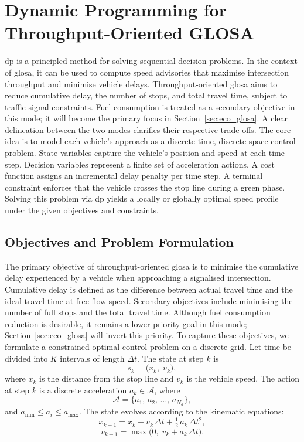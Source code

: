 \section{Dynamic Programming for Throughput-Oriented \ac{GLOSA}}
\label{sec:flow_glosa}

\ac{dp} is a principled method for solving sequential decision problems. In the context of \ac{glosa}, it can be used to compute speed advisories that maximise intersection throughput and minimise vehicle delays. Throughput-oriented \ac{glosa} aims to reduce cumulative delay, the number of stops, and total travel time, subject to traffic signal constraints. Fuel consumption is treated as a secondary objective in this mode; it will become the primary focus in Section~\ref{sec:eco_glosa}. A clear delineation between the two modes clarifies their respective trade-offs.
\mynewline
The core idea is to model each vehicle’s approach as a discrete-time, discrete-space control problem. State variables capture the vehicle’s position and speed at each time step. Decision variables represent a finite set of acceleration actions. A cost function assigns an incremental delay penalty per time step. A terminal constraint enforces that the vehicle crosses the stop line during a green phase. Solving this problem via \ac{dp} yields a locally or globally optimal speed profile under the given objectives and constraints.

\subsection{Objectives and Problem Formulation}
\label{subsec:flow_dp_formulation}

The primary objective of throughput-oriented \ac{glosa} is to minimise the cumulative delay experienced by a vehicle when approaching a signalised intersection. Cumulative delay is defined as the difference between actual travel time and the ideal travel time at free-flow speed. Secondary objectives include minimising the number of full stops and the total travel time. Although fuel consumption reduction is desirable, it remains a lower-priority goal in this mode; Section~\ref{sec:eco_glosa} will invert this priority.
\mynewline
To capture these objectives, we formulate a constrained optimal control problem on a discrete grid. Let time be divided into $K$ intervals of length $\Delta t$. The state at step $k$ is 
\[
s_k = \bigl(x_k,\;v_k\bigr),
\]
where $x_k$ is the distance from the stop line and $v_k$ is the vehicle speed. The action at step $k$ is a discrete acceleration $a_k\in\mathcal{A}$, where
\[
\mathcal{A}=\{a_1,\,a_2,\,\dots,\,a_{N_a}\},
\]
and $a_{\min}\le a_i\le a_{\max}$. The state evolves according to the kinematic equations:
\[
x_{k+1} = x_k + v_k\,\Delta t + \tfrac12\,a_k\,\Delta t^2,
\]
\[
v_{k+1} = \max\bigl(0,\;v_k + a_k\,\Delta t\bigr).
\]

